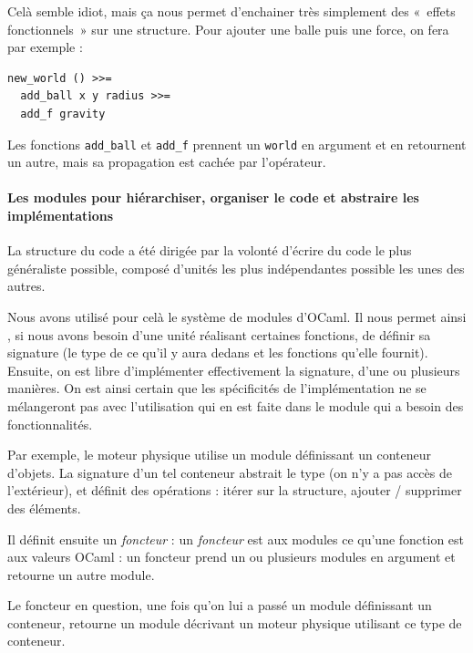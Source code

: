 \documentclass[a4paper]{scrartcl}
\begin{document}
Celà semble idiot, mais ça nous permet d'enchainer très simplement des
«~effets fonctionnels~» sur une structure. Pour ajouter une balle puis
une force, on fera par exemple :
\begin{verbatim}
new_world () >>=
  add_ball x y radius >>=
  add_f gravity
\end{verbatim}

Les fonctions \texttt{add\_ball} et \texttt{add\_f} prennent un
\texttt{world} en argument et en retournent un autre, mais sa
propagation est cachée par l'opérateur.

\paragraph{Les modules pour hiérarchiser, organiser le code et
  abstraire les implémentations}

La structure du code a été dirigée par la volonté d'écrire du code le
plus généraliste possible, composé d'unités les plus indépendantes
possible les unes des autres.

Nous avons utilisé pour celà le système de modules d'OCaml. Il nous
permet ainsi , si nous avons besoin d'une unité réalisant certaines
fonctions, de définir sa signature (le type de ce qu'il y aura dedans
et les fonctions qu'elle fournit). Ensuite, on est libre d'implémenter
effectivement la signature, d'une ou plusieurs manières. On est ainsi
certain que les spécificités de l'implémentation ne se mélangeront pas
avec l'utilisation qui en est faite dans le module qui a besoin des
fonctionnalités.

Par exemple, le moteur physique utilise un module définissant un
conteneur d'objets. La signature d'un tel conteneur abstrait le type
(on n'y a pas accès de l'extérieur), et définit des opérations :
itérer sur la structure, ajouter / supprimer des éléments.

Il définit ensuite un \emph{foncteur} : un \emph{foncteur} est aux
modules ce qu'une fonction est aux valeurs OCaml : un foncteur prend
un ou plusieurs modules en argument et retourne un autre module.

Le foncteur en question, une fois qu'on lui a passé un module
définissant un conteneur, retourne un module décrivant un moteur
physique utilisant ce type de conteneur.
\end{document}

